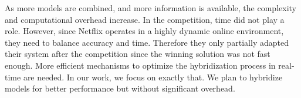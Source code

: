 As more models are combined, and more information is available, the complexity and computational overhead increase. In the competition, time did not play a role. However, since Netflix operates in a highly dynamic online environment, they need to balance accuracy and time. Therefore they only partially adapted their system after the competition since the winning solution was not fast enough. More efficient mechanisms to optimize the hybridization process in real-time are needed. In our work, we focus on exactly that. We plan to hybridize models for better performance but without significant overhead. 

